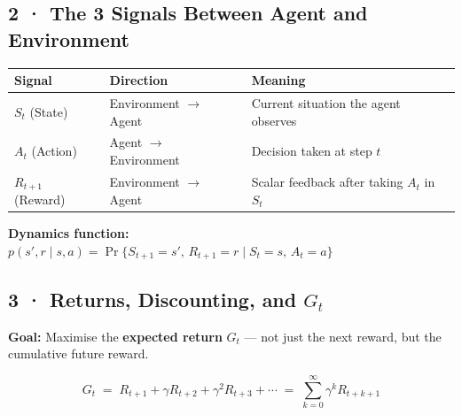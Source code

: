 \documentclass[11pt,a4paper]{article}
\begin{document}
\subsection*{2 · The 3 Signals Between Agent and Environment}

\begin{tcolorbox}[bold={Three Signals — Must Know}]
\begin{center}
\end{center}
\vspace{4pt}
\begin{tabular}{p{2.4cm}p{3.6cm}p{8cm}}
\textbf{Signal} & \textbf{Direction} & \textbf{Meaning} \\
\midrule
$S_t$ (State) & Environment $\to$ Agent & Current situation the agent observes \\
$A_t$ (Action) & Agent $\to$ Environment & Decision taken at step $t$ \\
$R_{t+1}$ (Reward) & Environment $\to$ Agent & Scalar feedback after taking $A_t$ in $S_t$ \\
\end{tabular}

\medskip
\textbf{Dynamics function:}
$\displaystyle p(s', r \mid s, a) = \Pr\{S_{t+1}=s',\, R_{t+1}=r \mid S_t=s,\, A_t=a\}$
\end{tcolorbox}

\subsection*{3 · Returns, Discounting, and $G_t$}

\textbf{Goal:} Maximise the \textbf{expected return} $G_t$ — not just the next reward, but the
cumulative future reward.

\begin{tcolorbox}[defn={Discounted Return}]
\[
  G_t \;=\; R_{t+1} + \gamma R_{t+2} + \gamma^2 R_{t+3} + \cdots
       \;=\; \sum_{k=0}^{\infty} \gamma^k R_{t+k+1}
\]
\end{tcolorbox}
\end{document}
